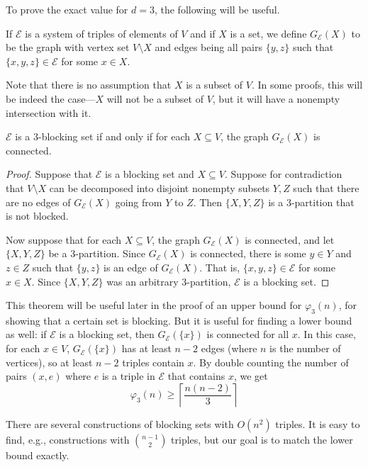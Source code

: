 \documentclass[11pt,a4paper]{article}
\begin{document}
To prove the exact value for $d=3$, the following will be useful.

\begin{definition}
    If $\mathcal{E}$ is a system of triples of elements of $V$ and if $X$ is a set, we define $G_{\mathcal{E}}(X)$ to be the graph with vertex set $V\setminus X$ and edges being all pairs $\{y,z\}$ such that $\{x,y,z\}\in \mathcal{E}$ for some $x\in X$.
\end{definition}

Note that there is no assumption that $X$ is a subset of $V$. In some proofs, this will be indeed the case---$X$ will not be a subset of $V$, but it will have a nonempty intersection with it.

\begin{theorem}\label{thm:characterization}
    $\mathcal{E}$ is a 3-blocking set if and only if for each $X\subseteq V$, the graph $G_{\mathcal{E}}(X)$ is connected.
\end{theorem}

\begin{proof}
 Suppose that $\mathcal{E}$ is a blocking set and $X\subseteq V$. Suppose for contradiction that $V\setminus X $ can be decomposed into disjoint nonempty subsets $Y,Z$ such that there are no edges of $G_{\mathcal{E}}(X)$ going from $Y$ to $Z$. Then $\{X,Y,Z\}$ is a 3-partition that is not blocked.

 Now suppose that for each $X\subseteq V$, the graph $G_{\mathcal{E}}(X)$ is connected, and let $\{X,Y,Z\}$ be a 3-partition. Since $G_{\mathcal{E}}(X)$ is connected, there is some $y\in Y$ and $z\in Z$ such that $\{y,z\}$ is an edge of $G_{\mathcal{E}}(X)$. That is, $\{x,y,z\}\in \mathcal{E}$ for some $x\in X$. Since $\{X,Y,Z\}$ was an arbitrary 3-partition, $\mathcal{E}$ is a blocking set.
\end{proof}

This theorem will be useful later in the proof of an upper bound for $\varphi_3(n)$, for showing that a certain set is blocking. But it is useful for finding a lower bound as well: if $\mathcal{E}$ is a blocking set, then $G_{\mathcal{E}}(\{x\})$ is connected for all $x$. In this case, for each $x\in V$, $G_{\mathcal{E}}(\{x\})$ has at least $n-2$ edges (where $n$ is the number of vertices), so at least $n-2$ triples contain $x$. By double counting the number of pairs $(x,e)$ where $e$ is a triple in $\mathcal{E}$ that contains $x$, we get
\[ \varphi_3(n)\geq \left\lceil \frac{n(n-2)}{3} \right\rceil\]

There are several constructions of blocking sets with $O(n^2)$ triples. It is easy to find, e.g., constructions with $\binom{n-1}{2}$ triples, but our goal is to match the lower bound exactly.
\end{document}

